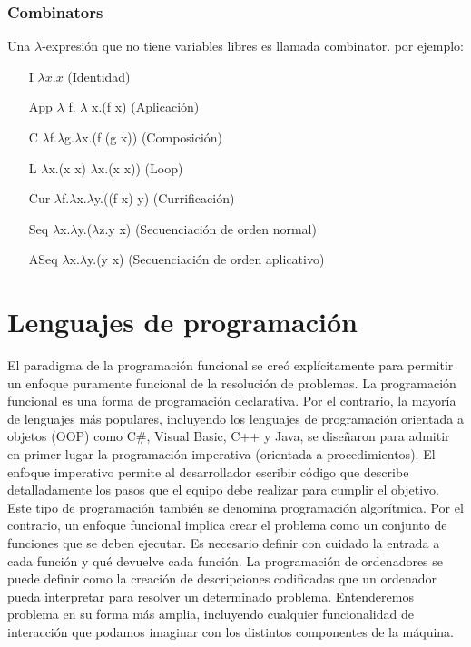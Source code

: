 \subsubsection{Combinators}
Una $\lambda$-expresión que no tiene variables libres es llamada 
combinator. por ejemplo:
\begin{itemize}
\item[I] $\lambda x.x$ (Identidad)
\item[App] $\lambda$ f. $\lambda$ x.(f x) (Aplicación)
\item[C] $\lambda$f.$\lambda$g.$\lambda$x.(f (g x)) (Composición)
\item[L] $\lambda$x.(x x) $\lambda$x.(x x)) (Loop)
\item[Cur] $\lambda$f.$\lambda$x.$\lambda$y.((f x) y) (Currificación)
\item[Seq] $\lambda$x.$\lambda$y.($\lambda$z.y x) (Secuenciación de orden normal)
\item[ASeq] $\lambda$x.$\lambda$y.(y x) (Secuenciación de orden aplicativo)
\end{itemize}

\section{Lenguajes de programación}

El paradigma de la programación funcional se creó explícitamente para permitir un enfoque puramente funcional de la resolución de problemas. La programación funcional es una forma de programación declarativa. Por el contrario, la mayoría de lenguajes más populares, incluyendo los lenguajes de programación orientada a objetos (OOP) como C\#, Visual Basic, C++ y Java, se diseñaron para admitir en primer lugar la programación imperativa (orientada a procedimientos).
El enfoque imperativo permite al desarrollador escribir código que describe detalladamente los pasos que el equipo debe realizar para cumplir el objetivo. Este tipo de programación también se denomina programación algorítmica. Por el contrario, un enfoque funcional implica crear el problema como un conjunto de funciones que se deben ejecutar. Es necesario definir con cuidado la entrada a cada función y qué devuelve cada función. \cite{CompMic}
La programación de ordenadores se puede definir como la creación de descripciones codificadas que un ordenador pueda interpretar para resolver un determinado problema. Entenderemos problema en su forma más amplia, incluyendo cualquier funcionalidad de interacción que podamos imaginar con los distintos componentes de la máquina.

